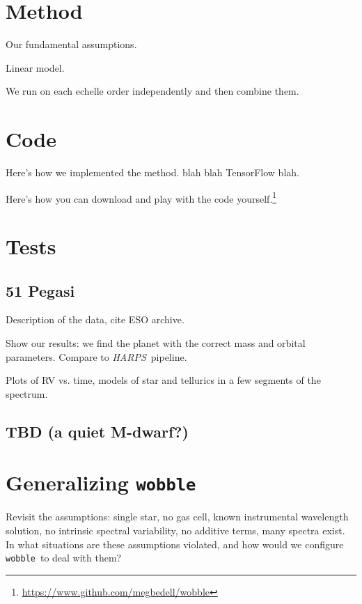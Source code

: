 \documentclass[twocolumn]{aastex62}
\newcommand{\acronym}[1]{{\small{#1}}}
\newcommand{\project}[1]{\textsl{#1}}
\newcommand{\HARPS}{\project{\acronym{HARPS}}}
\newcommand{\wobble}{\texttt{wobble}}
\begin{document}
\section{Method}

Our fundamental assumptions.

Linear model.

We run on each echelle order independently and then combine them.

\section{Code}

Here's how we implemented the method. blah blah TensorFlow blah.

Here's how you can download and play with the code yourself.\footnote{\url{https://www.github.com/megbedell/wobble}}

\section{Tests}
\subsection{51 Pegasi}

Description of the data, cite ESO archive.

Show our results: we find the planet with the correct mass and orbital parameters. Compare to \HARPS\ pipeline.

Plots of RV vs. time, models of star and tellurics in a few segments of the spectrum.

\subsection{TBD (a quiet M-dwarf?)}

\section{Generalizing \wobble}
\label{s:future}

Revisit the assumptions: single star, no gas cell, known instrumental wavelength solution, no intrinsic spectral variability, no additive terms, many spectra exist. 
In what situations are these assumptions violated, and how would we configure \wobble\ to deal with them?


\end{document}

